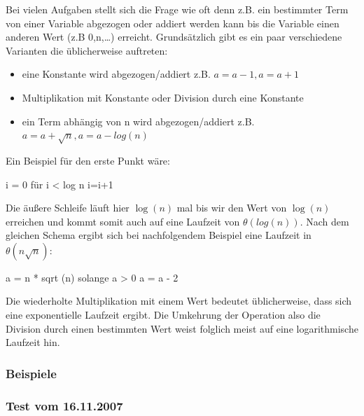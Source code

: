 \documentclass[a4paper, 12pt]{article}
\begin{document}
Bei vielen Aufgaben stellt sich die Frage wie oft denn z.B. ein bestimmter Term von einer Variable abgezogen oder addiert werden kann bis die Variable einen anderen Wert (z.B 0,n,\dots) erreicht. Grundsätzlich gibt es ein paar verschiedene Varianten die üblicherweise auftreten:

\begin{itemize}
	\item eine Konstante wird abgezogen/addiert z.B. $a=a-1, a=a+1$
	\item Multiplikation mit Konstante oder Division durch eine Konstante
	\item ein Term abhängig von n wird abgezogen/addiert z.B.\
	$a=a+\sqrt n, a=a-log\left(n\right)$ 
\end{itemize}

Ein Beispiel für den erste Punkt wäre:

\begin{verbatimtab}
i = 0
für i < log n {
	i=i+1
}
\end{verbatimtab}

Die äußere Schleife läuft hier $\log\left(n\right)$ mal bis wir den Wert von $\log\left(n\right)$ erreichen und kommt somit auch auf eine Laufzeit von $θ \left(log\left(n\right)\right)$. Nach dem gleichen Schema ergibt sich bei nachfolgendem Beispiel eine Laufzeit in $θ \left(n \sqrt n \right)$:

\begin{verbatimtab}
a = n * sqrt (n)
solange a > 0 {
	a = a - 2
}
\end{verbatimtab}

Die wiederholte Multiplikation mit einem Wert bedeutet üblicherweise, dass sich eine exponentielle Laufzeit ergibt. Die Umkehrung der Operation also die Division durch einen bestimmten Wert weist folglich meist auf eine logarithmische Laufzeit hin.

\subsubsection{Beispiele}

\subsubsection{Test vom 16.11.2007}
\label{section:Test_2007-11-16}
\end{document}
